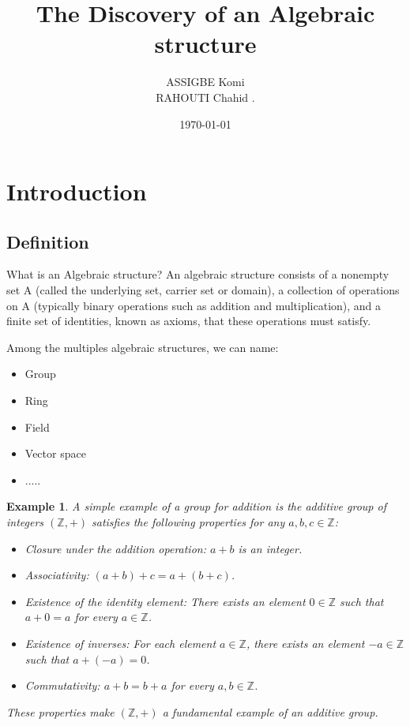 \documentclass{report}
\title{The Discovery of an  Algebraic structure}
\author{ASSIGBE Komi \\ RAHOUTI Chahid .}
\date{\today}
\newtheorem{Example}{Example}
\begin{document}
\maketitle
\newpage
\tableofcontents

\newpage

\section{Introduction}

\subsection{Definition}
    What is an Algebraic structure? An algebraic structure consists of a nonempty set A (called the underlying set, carrier set or domain), a collection of operations on A (typically binary operations such as addition and multiplication), and a finite set of identities, known as axioms, that these operations must satisfy.

    Among the multiples algebraic structures, we can name:
    \begin{itemize}
        \item Group
        \item Ring
        \item Field
        \item Vector space
                \item .....
            \end{itemize}

        \begin{Example}
            A simple example of a group for 
            addition is the additive group 
            of integers $ (\mathbb{Z}, +) $ 
            satisfies the following properties 
            for any $ a, b, c \in \mathbb{Z} $:
            \begin{itemize}
                \item Closure under the addition operation: $ a + b $ is an integer.
                \item Associativity: $ (a + b) + c = a + (b + c) $.
                \item Existence of the identity element: There exists an element $ 0 \in \mathbb{Z} $ such that $ a + 0 = a $ for every $ a \in \mathbb{Z} $.
                \item Existence of inverses: For each element $ a \in \mathbb{Z} $, there exists an element $ -a \in \mathbb{Z} $ such that $ a + (-a) = 0 $.
                \item Commutativity: $ a + b = b + a $ for every $ a, b \in \mathbb{Z} $.
            \end{itemize}
        These properties make $ (\mathbb{Z}, +) $ a fundamental example of an additive group.
            
        \end{Example}   
\end{document}
